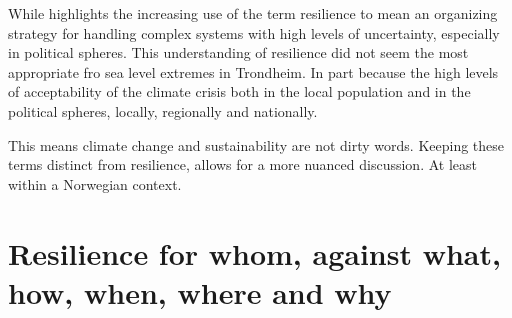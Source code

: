While \cite{moser_turbulent_2019} highlights the increasing use of the term resilience to mean an organizing strategy for handling complex systems with high levels of uncertainty, especially in political spheres. This understanding of resilience did not seem the most appropriate fro sea level extremes in Trondheim. In part because the high levels of acceptability of the climate crisis both in the local population and in the political spheres, locally, regionally and nationally. 

This means climate change and sustainability are not dirty words. Keeping these terms distinct from resilience, allows for a more nuanced discussion. At least within a Norwegian context.

\section{Resilience for whom, against what, how, when, where and why}




